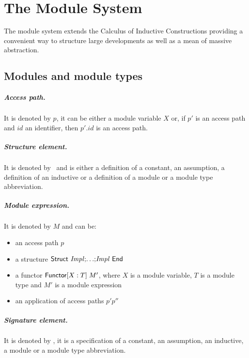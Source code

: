 \chapter{The Module System}
\label{chapter:Modules}

The module system extends the Calculus of Inductive Constructions
providing a convenient way to structure large developments as well as
a mean of massive abstraction.

\section{Modules and module types}

\paragraph{Access path.} It is denoted by $p$, it can be either a module 
variable $X$ or, if $p'$ is an access path and $id$ an identifier, then
$p'.id$ is an access path.

\paragraph{Structure element.} It is denoted by \Impl\ and is either a
definition of a constant, an assumption, a definition of an inductive
or a definition of a module or a module type abbreviation.

\paragraph{Module expression.} It is denoted by $M$ and can be:
\begin{itemize}
\item an access path $p$
\item a structure ${\sf Struct}~{{\it Impl}} {\tt ;} {\ldots} {\tt ;} {{\it Impl}}~{\sf End}$
\item a functor ${\sf Functor}[X:T]\;M'$, where $X$ is a module variable,
  $T$ is a module type and $M'$ is a module expression
\item an application of access paths $p' p''$
\end{itemize}

\paragraph{Signature element.} It is denoted by \Spec, it is a
specification of a constant, an assumption, an inductive, a module or
a module type abbreviation.

